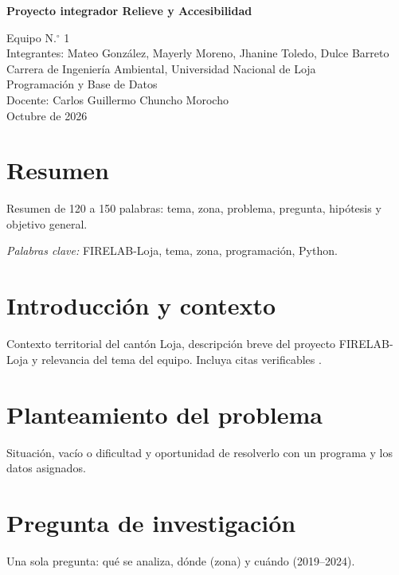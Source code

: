 \documentclass[12pt,a4paper]{article}
\begin{document}
\begin{titlepage}
\centering
\singlespacing
\vspace*{2cm}
{\bfseries Proyecto integrador
Relieve y Accesibilidad\par}
\vspace{1.5cm}
Equipo N.$^{\circ}$ 1 \ \\
Integrantes: Mateo González, Mayerly Moreno, Jhanine Toledo, Dulce Barreto\\[1cm]
Carrera de Ingenier\'ia Ambiental, Universidad Nacional de Loja\\
Programaci\'on y Base de Datos\\
Docente: Carlos Guillermo Chuncho Morocho\\[1cm]
Octubre de 2026
\end{titlepage}

\section*{Resumen}
\singlespacing
Resumen de 120 a 150 palabras: tema, zona, problema, pregunta, hip\'otesis y objetivo general.

\noindent\textit{Palabras clave:} FIRELAB-Loja, tema, zona, programaci\'on, Python.
\doublespacing
\newpage

\section{Introducci\'on y contexto}
Contexto territorial del cant\'on Loja, descripci\'on breve del proyecto FIRELAB-Loja y relevancia del tema del equipo. Incluya citas verificables \parencite{firelab2025}.

\section{Planteamiento del problema}
Situaci\'on, vac\'io o dificultad y oportunidad de resolverlo con un programa y los datos asignados.

\section{Pregunta de investigaci\'on}
Una sola pregunta: qu\'e se analiza, d\'onde (zona) y cu\'ando (2019--2024).
\end{document}
